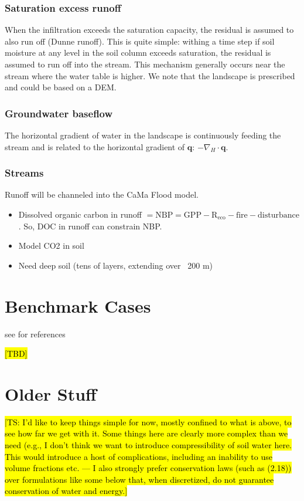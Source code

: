 \documentclass{report}
\begin{document}
\subsubsection{Saturation excess runoff}
When the infiltration exceeds the saturation capacity, the residual is assumed to also run off (Dunne runoff). This is quite simple: withing a time step if soil moisture at any level in the soil column exceeds saturation, the residual is assumed to run off into the stream. This mechanism generally occurs near the stream where the water table is higher. We note that the landscape is prescribed and could be based on a DEM. 

\subsubsection{Groundwater baseflow}
The horizontal gradient of water in the landscape is continuously feeding the stream and is related to the horizontal gradient of $\mathbf{q}$: $-\nabla_H \cdot \mathbf{q}$.

\subsubsection{Streams}
Runoff will be channeled into the CaMa Flood model.

\begin{itemize}
\item Dissolved organic carbon in runoff $\mathrm{= NBP = GPP - R_{eco} - fire - disturbance}$. So, DOC in runoff can constrain NBP.

\item Model CO2 in soil
\item Need deep soil (tens of layers, extending over ~200 m)
\end{itemize}


\section{Benchmark Cases}

see \citet{Clark15a} for references

\hl{[TBD]}


\section{Older Stuff}

\hl{[TS: I'd like to keep things simple for now, mostly confined to what is above, to see how far we get with it. Some things here are clearly more complex than we need (e.g., I don't think we want to introduce compressibility of soil water here. This would introduce a host of complications, including an inability to use volume fractions etc. --- I also strongly prefer conservation laws (such as (2.18)) over formulations like some below that, when discretized, do not guarantee conservation of water and energy.]}
\end{document}
